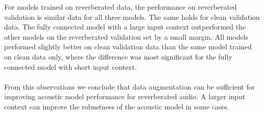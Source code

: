 For models trained on reverberated data, the performance on reverberated validation is similar data for all three models. The same holds for clean validation data. The fully connected model with a large input context outperformed the other models on the reverberated validation set by a small margin. All models performed slightly better on clean validation data than the same model trained on clean data only, where the difference was most significant for the fully connected model with short input context. \\ \\
From this observations we conclude that data augmentation can be sufficient for improving acoustic model performance for reverberated audio. A larger input context can improve the robustness of the acoustic model in some cases. 


\iffalse
TODO: Describe how we generated reverbed data
TODO: Describe how we tested on reverbed data
TODO: Describe final architecture and results

This chapter should summarize and interpret the results. It should give a clear insight
about which methods did decrease the FER and WER on reverbed and unreverbed data, respectivley.
\fi